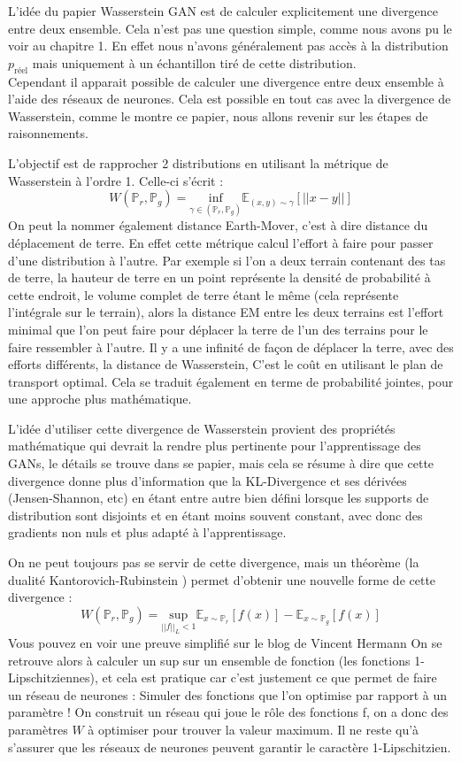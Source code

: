 L'idée du papier Wasserstein GAN est de calculer explicitement une divergence entre deux ensemble. Cela n'est pas une question simple, comme nous avons pu le voir au chapitre 1. En effet nous n'avons généralement pas accès à la distribution $p_{\text{réel}}$ mais uniquement à un échantillon tiré de cette distribution. \\ Cependant il apparait possible de calculer une divergence entre deux ensemble à l'aide des réseaux de neurones. Cela est possible en tout cas avec la divergence de Wasserstein, comme le montre ce papier, nous allons revenir sur les étapes de raisonnements.

L'objectif est de rapprocher 2 distributions en utilisant la métrique de Wasserstein à l'ordre 1. Celle-ci s'écrit :
\[
W(\mathbb{P}_r, \mathbb{P}_g)= \underset{\gamma \in (\mathbb{P}_r, \mathbb{P}_g)}{\text{inf}} \mathbb{E}_{(x,y)\sim\gamma} \left[ ||x-y||\right]
\]
On peut la nommer également distance Earth-Mover, c'est à dire distance du déplacement de terre. En effet cette métrique calcul l'effort à faire pour passer d'une distribution à l'autre. Par exemple si l'on a deux terrain contenant des tas de terre, la hauteur de terre en un point représente la densité de probabilité à cette endroit, le volume complet de terre étant le même (cela représente l'intégrale sur le terrain), alors la distance EM entre les deux terrains est l'effort minimal que l'on peut faire pour déplacer la terre de l'un des terrains pour le faire ressembler à l'autre. Il y a une infinité de façon de déplacer la terre, avec des efforts différents, la distance de Wasserstein, C'est le coût en utilisant le plan de transport optimal. Cela se traduit également en terme de probabilité jointes, pour une approche plus mathématique. 

L'idée d'utiliser cette divergence de Wasserstein provient des propriétés mathématique qui devrait la rendre plus pertinente pour l'apprentissage des GANs, le détails se trouve dans se papier, mais cela se résume à dire que cette divergence donne plus d'information que la KL-Divergence et ses dérivées (Jensen-Shannon, etc) en étant entre autre bien défini lorsque les supports de distribution sont disjoints et en étant moins souvent constant, avec donc des gradients non nuls et plus adapté à l'apprentissage.

On ne peut toujours pas se servir de cette divergence, mais un théorème (la dualité Kantorovich-Rubinstein \cite{optimal-transport}) permet d'obtenir une nouvelle forme de cette divergence :
\[
W(\mathbb{P}_r, \mathbb{P}_g) = \underset{||f||_L<1}{\text{sup}}\mathbb{E}_{x\sim\mathbb{P}_r}\left[f(x)\right] - \mathbb{E}_{x\sim\mathbb{P}_g}\left[f(x)\right]
\]
Vous pouvez en voir une preuve simplifié sur le blog de Vincent Hermann \cite{preuve-wgan}
On se retrouve alors à calculer un sup sur un ensemble de fonction (les fonctions 1-Lipschitziennes), et cela est pratique car c'est justement ce que permet de faire un réseau de neurones : Simuler des fonctions que l'on optimise par rapport à un paramètre ! On construit un réseau qui joue le rôle des fonctions f, on a donc des paramètres $W$ à optimiser pour trouver la valeur maximum. Il ne reste qu'à s'assurer que les réseaux de neurones peuvent garantir le caractère 1-Lipschitzien.

